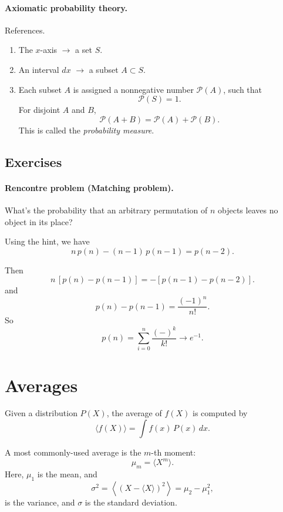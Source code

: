 \documentclass{book}
\numberwithin{equation}{section}
\theoremstyle{plain}
\theoremstyle{definition}
\theoremstyle{remark}
\begin{document}
\paragraph{Axiomatic probability theory.}

References\cite{kolmogorov}.

\begin{enumerate}
\item The $x$-axis $\rightarrow$ a set $S$.
\item An interval $dx$ $\rightarrow$ a subset $A \subset S$.
\item Each subset $A$ is assigned
  a nonnegative number $\mathcal P(A)$, such that
  $$
  \mathcal P(S) = 1.
  $$
  For disjoint $A$ and $B$,
  $$
  \mathcal P(A + B) = \mathcal P(A) + \mathcal P(B).
  $$
  This is called the \emph{probability measure}.
\end{enumerate}

\subsection*{Exercises}

\paragraph{Rencontre problem (Matching problem).}

What's the probability that an arbitrary permutation
of $n$ objects leaves no object in its place?

Using the hint, we have
$$
n \, p(n) - (n-1) \, p(n-1) = p(n-2).
$$

Then
$$
n \, [p(n) - p(n-1)] = - [ p(n-1) - p(n-2)].
$$
and
$$
p(n) - p(n-1) = \frac{ (-1)^{n} }{n!}.
$$
So
$$
p(n) = \sum_{i = 0}^n \frac{ (-)^{k} } { k! } \rightarrow e^{-1}.
$$




\section{Averages}

Given a distribution $P(X)$, the average of $f(X)$ is computed by
$$
\langle f(X) \rangle
=
\int f(x) \, P(x) \, dx.
$$

A most commonly-used average is the $m$-th moment:
$$
\mu_m = \langle X^m \rangle.
$$
Here, $\mu_1$ is the mean, and
\begin{equation}
\sigma^2 =
\left\langle
  (X - \langle X \rangle )^2
\right\rangle
= \mu_2 - \mu_1^2,
\end{equation}
is the variance, and $\sigma$ is the standard deviation.
\end{document}
